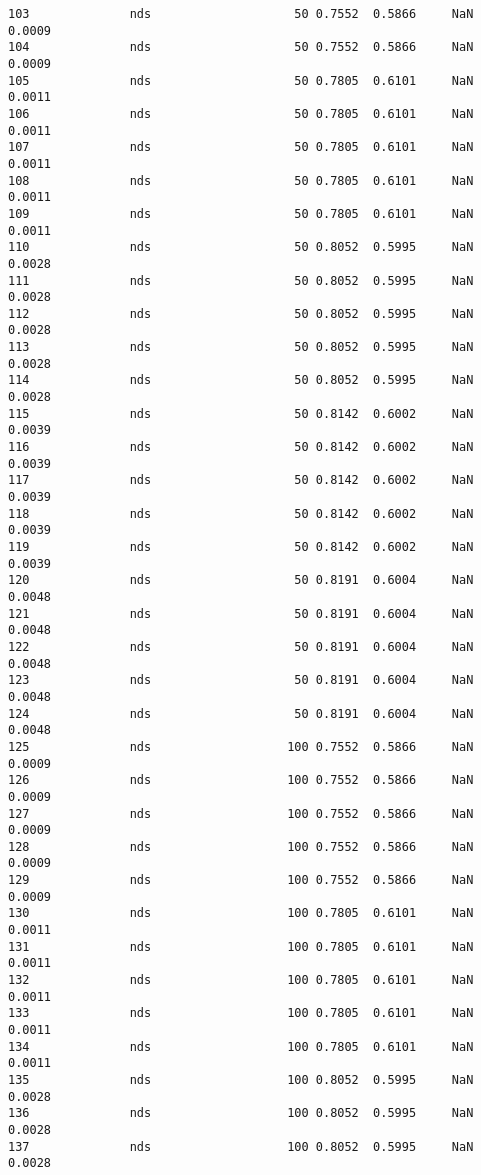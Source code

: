 \documentclass[11pt]{article}
\begin{document}
\begin{Verbatim}[commandchars=\\\{\}]
103              nds                    50 0.7552  0.5866     NaN 0.0009   
104              nds                    50 0.7552  0.5866     NaN 0.0009   
105              nds                    50 0.7805  0.6101     NaN 0.0011   
106              nds                    50 0.7805  0.6101     NaN 0.0011   
107              nds                    50 0.7805  0.6101     NaN 0.0011   
108              nds                    50 0.7805  0.6101     NaN 0.0011   
109              nds                    50 0.7805  0.6101     NaN 0.0011   
110              nds                    50 0.8052  0.5995     NaN 0.0028   
111              nds                    50 0.8052  0.5995     NaN 0.0028   
112              nds                    50 0.8052  0.5995     NaN 0.0028   
113              nds                    50 0.8052  0.5995     NaN 0.0028   
114              nds                    50 0.8052  0.5995     NaN 0.0028   
115              nds                    50 0.8142  0.6002     NaN 0.0039   
116              nds                    50 0.8142  0.6002     NaN 0.0039   
117              nds                    50 0.8142  0.6002     NaN 0.0039   
118              nds                    50 0.8142  0.6002     NaN 0.0039   
119              nds                    50 0.8142  0.6002     NaN 0.0039   
120              nds                    50 0.8191  0.6004     NaN 0.0048   
121              nds                    50 0.8191  0.6004     NaN 0.0048   
122              nds                    50 0.8191  0.6004     NaN 0.0048   
123              nds                    50 0.8191  0.6004     NaN 0.0048   
124              nds                    50 0.8191  0.6004     NaN 0.0048   
125              nds                   100 0.7552  0.5866     NaN 0.0009   
126              nds                   100 0.7552  0.5866     NaN 0.0009   
127              nds                   100 0.7552  0.5866     NaN 0.0009   
128              nds                   100 0.7552  0.5866     NaN 0.0009   
129              nds                   100 0.7552  0.5866     NaN 0.0009   
130              nds                   100 0.7805  0.6101     NaN 0.0011   
131              nds                   100 0.7805  0.6101     NaN 0.0011   
132              nds                   100 0.7805  0.6101     NaN 0.0011   
133              nds                   100 0.7805  0.6101     NaN 0.0011   
134              nds                   100 0.7805  0.6101     NaN 0.0011   
135              nds                   100 0.8052  0.5995     NaN 0.0028   
136              nds                   100 0.8052  0.5995     NaN 0.0028   
137              nds                   100 0.8052  0.5995     NaN 0.0028   

\end{Verbatim}
\end{document}
